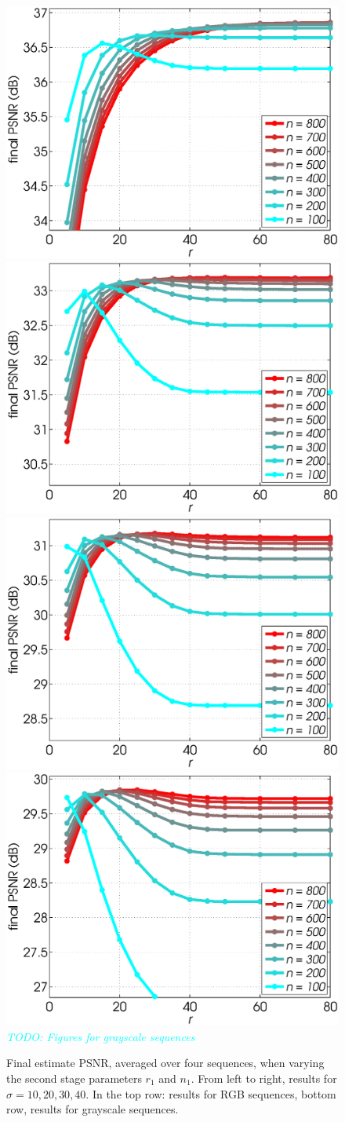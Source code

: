 \documentclass[10pt, journal, twocolumn, final, a4paper]{IEEEtran}
\newcommand{\pa}[1]{\textcolor{cyan}{#1}}
\newcommand{\pcomment}[1]{\textit{\pa{#1}}}
\begin{document}
\begin{figure}[htpb!]
	\begin{center}
		\includegraphics[width=.25\textwidth]{figs/params_tables/fpsnr_r1-np1-curves_s10_average_derf.eps}%
		\includegraphics[width=.25\textwidth]{figs/params_tables/fpsnr_r1-np1-curves_s20_average_derf.eps}%
		\includegraphics[width=.25\textwidth]{figs/params_tables/fpsnr_r1-np1-curves_s30_average_derf.eps}%
		\includegraphics[width=.25\textwidth]{figs/params_tables/fpsnr_r1-np1-curves_s40_average_derf.eps}\\

		\vspace{1cm}
		\pcomment{TODO: Figures for grayscale sequences}
		\vspace{1cm}

	\end{center}
	\caption{Final estimate PSNR, averaged over four sequences, when varying the
		second stage parameters $r_1$ and $n_1$. From left to right, results for
		$\sigma = 10, 20, 30, 40$. In the top row: results for RGB sequences, bottom
		row, results for grayscale sequences.} 
	\label{fig:rank1-nsim1-fpsnr}
\end{figure}
\end{document}
